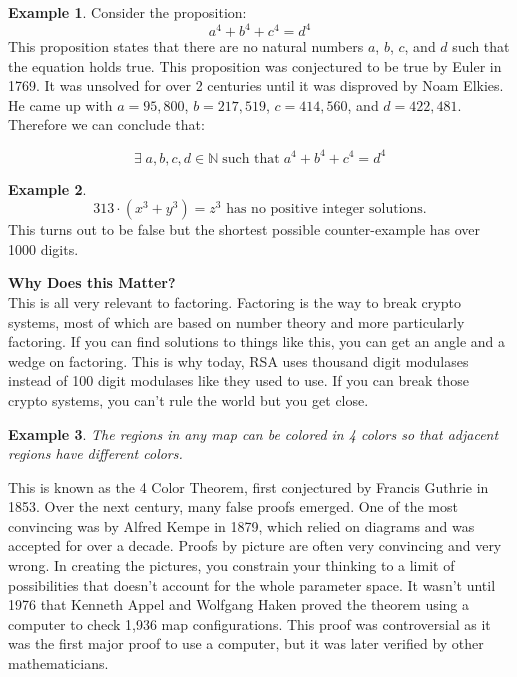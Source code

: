 \documentclass[11pt]{article}
\theoremstyle{definition}
\newtheorem{example}{Example}
\begin{document}
\begin{example}
  Consider the proposition:
  \[
  a^4 + b^4 + c^4 = d^4
  \]
  This proposition states that there are no natural numbers \(a\), \(b\), \(c\), and \(d\) such that the equation holds true. This proposition was conjectured to be true by Euler in 1769. It was unsolved for over 2 centuries until it was disproved by Noam Elkies. He came up with \( a = 95,800 \), \( b = 217,519 \), \( c = 414,560 \), and \( d = 422,481 \). Therefore we can conclude that:

  \[
  \exists \; a, b, c, d \in \mathbb{N} \; \text{such that} \; a^4 + b^4 + c^4 = d^4
  \]
\end{example}

\begin{example}
  \[
    313 \cdot (x^3 + y^3) = z^3 \text{ has no positive integer solutions.}
  \]
  This turns out to be false but the shortest possible counter-example has over 1000 digits.
  \vspace{.5cm}
  
  \textbf{Why Does this Matter?} \\
  This is all very relevant to factoring. Factoring is the way to break crypto systems, most of which are based on number theory and more particularly factoring. If you can find solutions to things like this, you can get an angle and a wedge on factoring. This is why today, RSA uses thousand digit modulases instead of 100 digit modulases like they used to use. If you can break those crypto systems, you can't rule the world but you get close.
\end{example}

\begin{example}
\textit{The regions in any map can be colored in 4 colors so that adjacent regions have different colors.}
\vspace{.5cm}

This is known as the 4 Color Theorem, first conjectured by Francis Guthrie in 1853. Over the next century, many false proofs emerged. One of the most convincing was by Alfred Kempe in 1879, which relied on diagrams and was accepted for over a decade. Proofs by picture are often very convincing and very wrong. In creating the pictures, you constrain your thinking to a limit of possibilities that doesn't account for the whole parameter space. It wasn't until 1976 that Kenneth Appel and Wolfgang Haken proved the theorem using a computer to check 1,936 map configurations. This proof was controversial as it was the first major proof to use a computer, but it was later verified by other mathematicians.
\end{example}
\end{document}
